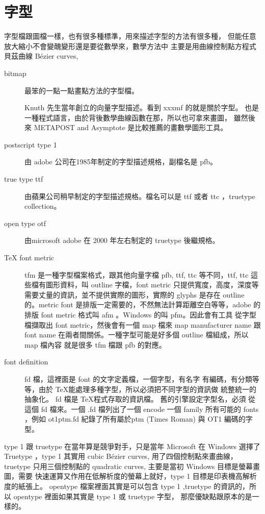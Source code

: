 \section{字型}
字型檔跟圖檔一樣，也有很多種標準，用來描述字型的方法有很多種，
但能任意放大縮小不會變醜變形還是要從數學來，數學方法中
主要是用曲線控制點方程式貝茲曲線 Bézier curves,
\begin{description}
\item [bitmap] 最笨的一點一點畫點方法的字型檔。
\item [\MF{}] Knuth 先生當年創立的向量字型描述。看到 xxxmf 的就是關於字型。
\MF{} 也是一種程式語言，由於背後數學曲線函數在那，所以也可拿來畫圖，
雖然後來 METAPOST and Asymptote 是比較推薦的畫數學圖形工具。
\item [postscript type 1] 由 adobe 公司在1985年制定的字型描述規格，副檔名是 pfb。
\item [true type ttf] 由蘋果公司稍早制定的字型描述規格。檔名可以是 ttf 或者 ttc
，truetype collection。
\item [open type otf] 由microsoft adobe 在 2000 年左右制定的 truetype 後繼規格。
\item [TeX font metric] tfm 是一種字型檔案格式，跟其他向量字檔 pfb, ttf, ttc
等不同，ttf, ttc 這些檔有圖形資料，叫 outline 字檔，font metric
只提供寬度，高度，深度等需要丈量的資訊，並不提供實際的圖形，實際的 glyphs
是存在 outline 的。metric font 是排版一定需要的，不然無法計算距離空白等等，adobe
的排版 font metric 格式叫 afm 。Windows 的叫 pfm。因此會有工具
從字型檔擷取出 font metric，然後會有一個 map 檔來 map manufacturer name 跟
font name 在兩者間關係。一種字型可能是好多個 outline 檔組成，所以 map 檔內容
就是很多 tfm 檔跟 pfb 的對應。
\item [font definition] fd 檔，這裡面是 font 的文字定義檔，一個字型，有名字
有編碼，有分類等等，由於 \TeX 能處理多種字型，所以必須把不同字型的資訊做
統整統一的抽象化。
fd 檔是 \TeX 程式存取的資訊檔。 舊的引擎設定字型名，必須
從這個 fd 檔來。一個 .fd 檔列出了一個 encode 一個 family 所有可能的 fonts
，例如 ot1ptm.fd 紀錄了所有屬於ptm (Times Roman) 與 OT1 編碼的字型。
\end{description}
type 1 跟 truetype 在當年算是競爭對手，只是當年 Microsoft 在 Windows 選擇了
Truetype ，type 1 其實用 cubic Bézier curves, 用了四個控制點來畫曲線，truetype
只用三個控制點的 quadratic curves, 主要是當初 Windows 目標是螢幕畫圖，需要
快速運算又作用在低解析度的螢幕上就好，type 1 目標是印表機高解析度的紙張上。
opentype 檔案裡面其實是可以包含 type 1
,truetype 的資訊的，所以 opentype 裡面如果其實是 type 1 或 truetype 字型，
那麼優缺點跟原本的是一樣的。
